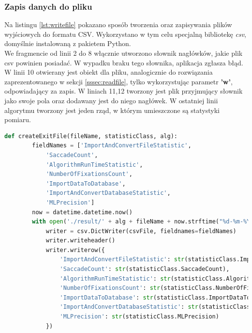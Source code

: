 \subsubsection{Zapis danych do pliku}
\label{sssec:savefile}
Na listingu \ref{lst:writefile} pokazano sposób tworzenia oraz zapisywania plików wyjściowych do formatu CSV. Wykorzystano w tym celu specjalną bibliotekę \emph{csv}, domyślnie instalowaną z pakietem Python.\\
We fragmencie od linii 2 do 8 włącznie utworzono słownik nagłówków, jakie plik csv powinien posiadać. W wypadku braku tego słownika, aplikacja zgłasza błąd. W linii 10 otwierany jest obiekt dla pliku, analogicznie do rozwiązania zaprezentowanego w sekcji \ref{sssec:readfile}, tylko wykorzystując parametr \textbf{'w'}, odpowiadający za zapis. W liniach 11,12 tworzony jest plik przyjmujący słownik jako swoje pola oraz dodawany jest do niego nagłówek. W ostatniej linii algorytmu tworzony jest jeden rząd, w którym umieszczone są statystyki pomiaru.
\begin{lstlisting}[language=Python, caption=Zapis danych do pliku csv, label={lst:writefile}]
def createExitFile(fileName, statisticClass, alg):
        fieldNames = ['ImportAndConvertFileStatistic',
            'SaccadeCount',
            'AlgorithmRunTimeStatistic',
            'NumberOfFixationsCount',
            'ImportDataToDatabase',
            'ImportAndConvertDatabaseStatistic',
            'MLPrecision']
        now = datetime.datetime.now()
        with open('./result/' + alg + fileName + now.strftime("%d-%m-%Y-%H%M%S") + '.csv', 'w', newline='') as csvFile:
            writer = csv.DictWriter(csvFile, fieldnames=fieldNames)
            writer.writeheader()
            writer.writerow({
                'ImportAndConvertFileStatistic': str(statisticClass.ImportAndConvertFileStatistic),
                'SaccadeCount': str(statisticClass.SaccadeCount),
                'AlgorithmRunTimeStatistic': str(statisticClass.AlgorithmRunTimeStatistic),
                'NumberOfFixationsCount': str(statisticClass.NumberOfFixationsCount),
                'ImportDataToDatabase': str(statisticClass.ImportDataToDatabase),
                'ImportAndConvertDatabaseStatistic': str(statisticClass.ImportAndConvertDatabaseStatistic),
                'MLPrecision': str(statisticClass.MLPrecision)
            })
\end{lstlisting}
